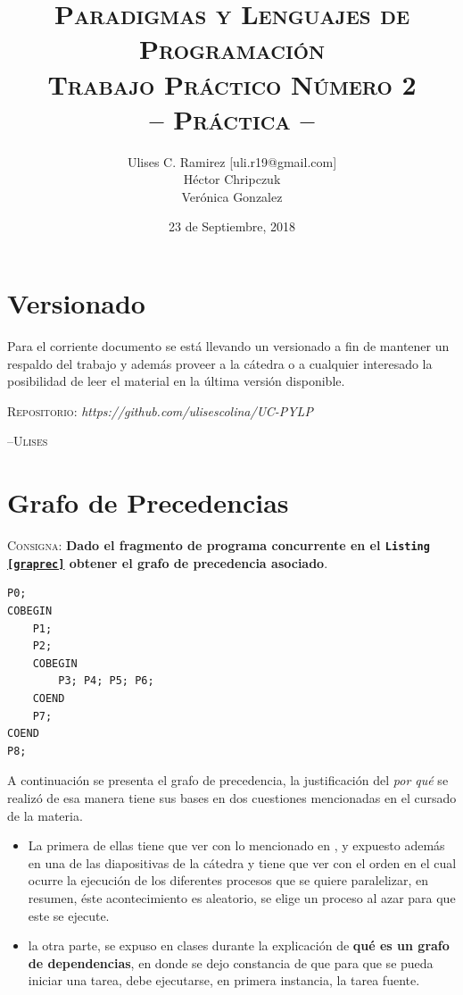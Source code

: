 \documentclass{article}
\title{\textsc{Paradigmas y Lenguajes de Programaci\'on\\Trabajo Pr\'actico N\'umero 2\\-- Pr\'actica --}}
\author{Ulises C. Ramirez [uli.r19@gmail.com]\\H\'ector Chripczuk\\Ver\'onica Gonzalez}
\date{23 de Septiembre, 2018}
\begin{document}
\maketitle
{}
\newpage
\section*{Versionado}
Para el corriente documento se est\'a llevando un versionado a fin de mantener un respaldo del trabajo y adem\'as proveer a la c\'atedra o a cualquier interesado la posibilidad de leer el material en la \'ultima versi\'on disponible.\\

\begin{center}
  \textsc{Repositorio}: \textit{https://github.com/ulisescolina/UC-PYLP}
\end{center}


\hfill--\textsc{Ulises}\tableofcontents
{}
\newpage

\section{Grafo de Precedencias}
\label{sec:}
\textsc{Consigna}: \textbf{Dado el fragmento de programa concurrente en el \texttt{Listing \ref{graprec}} obtener el grafo de precedencia asociado}.

\begin{lstlisting}[caption={Fragmento de programa concurrente}, label=graprec]
P0;
COBEGIN
	P1;
	P2;
	COBEGIN
		P3; P4; P5; P6;
	COEND
	P7;
COEND
P8;
\end{lstlisting}

A continuaci\'on se presenta el grafo de precedencia, la justificaci\'on del \textit{por qu\'e} se realiz\'o de esa manera tiene  sus bases en dos cuestiones mencionadas en el cursado de la materia.
\begin{itemize}
\item La primera de ellas tiene que ver con lo mencionado en \cite{gortazarbellas}, y expuesto adem\'as en una de las diapositivas de la c\'atedra y tiene que ver con el orden en el cual ocurre la ejecuci\'on de los diferentes procesos que se quiere paralelizar, en resumen, \'este acontecimiento es aleatorio, se elige un proceso al azar para que este se ejecute.
\item la otra parte, se expuso en clases durante la explicaci\'on de \textbf{qu\'e es un grafo de dependencias}, en donde se dejo constancia de que para que se pueda iniciar una tarea, debe ejecutarse, en primera instancia, la tarea fuente.
\end{itemize}
\end{document}
